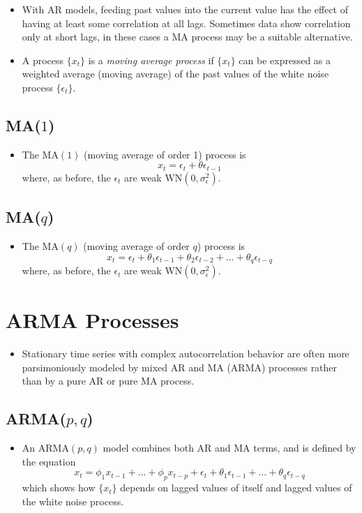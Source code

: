\documentclass[11pt]{article}
\begin{document}
\begin{itemize}
    \item With AR models, feeding past values into the current value has the effect of having 
    at least some correlation at all lags. Sometimes data show correlation only at short lags, 
    in these cases a MA process may be a suitable alternative.
    \item A process $\{x_t\}$ is a \textit{moving average process} if $\{x_t\}$ can be 
    expressed as a weighted average (moving average) of the past values of the white noise 
    process $\{\epsilon_t\}$.
\end{itemize}

\subsection{MA($1$)}
\begin{itemize}
    \item The $\text{MA}(1)$ (moving average of order 1) process is 
    \[x_t = \epsilon_t + \theta \epsilon_{t-1}\]
    where, as before, the $\epsilon_t$ are weak $\text{WN}(0, \sigma_{\epsilon}^{2})$.
\end{itemize}

\subsection{MA($q$)}
\begin{itemize}
    \item The $\text{MA}(q)$ (moving average of order $q$) process is 
    \[x_t = \epsilon_t + \theta_1 \epsilon_{t-1} + \theta_2 \epsilon_{t-2} + \hdots + \theta_q \epsilon_{t-q} \]
    where, as before, the $\epsilon_t$ are weak $\text{WN}(0, \sigma_{\epsilon}^{2})$.
\end{itemize}

\section{ARMA Processes}
\begin{itemize}
    \item Stationary time series with complex autocorrelation behavior are often more 
    parsimoniously modeled by mixed AR and MA (ARMA) processes rather than by a pure AR or pure
    MA process.
\end{itemize}

\subsection{ARMA($p,q$)}
\begin{itemize}
    \item An $\text{ARMA}(p,q)$ model combines both AR and MA terms, and is defined by the 
    equation 
    \[x_t = \phi_1 x_{t-1} + \hdots + \phi_p x_{t-p} + \epsilon_t + \theta_1 \epsilon_{t-1} + 
    \hdots + \theta_q \epsilon_{t-q}\]
    which shows how $\{x_t\}$ depends on lagged values of itself and lagged values of the white
    noise process.
\end{itemize}
\end{document}
